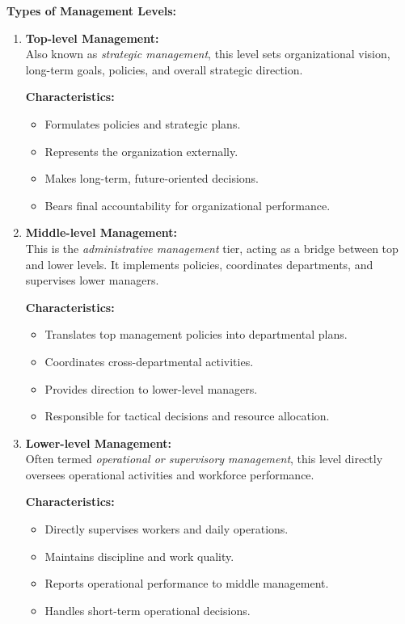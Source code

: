 \documentclass[12pt,a4paper]{book}
\begin{document}
\textbf{Types of Management Levels:}
\begin{enumerate}
    \item \textbf{Top-level Management:}\\
    Also known as \textit{strategic management}, this level sets organizational vision, long-term goals, policies, and overall strategic direction.
    
    \textbf{Characteristics:}
    \begin{itemize}
        \item Formulates policies and strategic plans.
        \item Represents the organization externally.
        \item Makes long-term, future-oriented decisions.
        \item Bears final accountability for organizational performance.
    \end{itemize}

    \item \textbf{Middle-level Management:}\\
    This is the \textit{administrative management} tier, acting as a bridge between top and lower levels. It implements policies, coordinates departments, and supervises lower managers.

    \textbf{Characteristics:}
    \begin{itemize}
        \item Translates top management policies into departmental plans.
        \item Coordinates cross-departmental activities.
        \item Provides direction to lower-level managers.
        \item Responsible for tactical decisions and resource allocation.
    \end{itemize}

    \item \textbf{Lower-level Management:}\\
    Often termed \textit{operational or supervisory management}, this level directly oversees operational activities and workforce performance.

    \textbf{Characteristics:}
    \begin{itemize}
        \item Directly supervises workers and daily operations.
        \item Maintains discipline and work quality.
        \item Reports operational performance to middle management.
        \item Handles short-term operational decisions.
    \end{itemize}
\end{enumerate}
\end{document}
